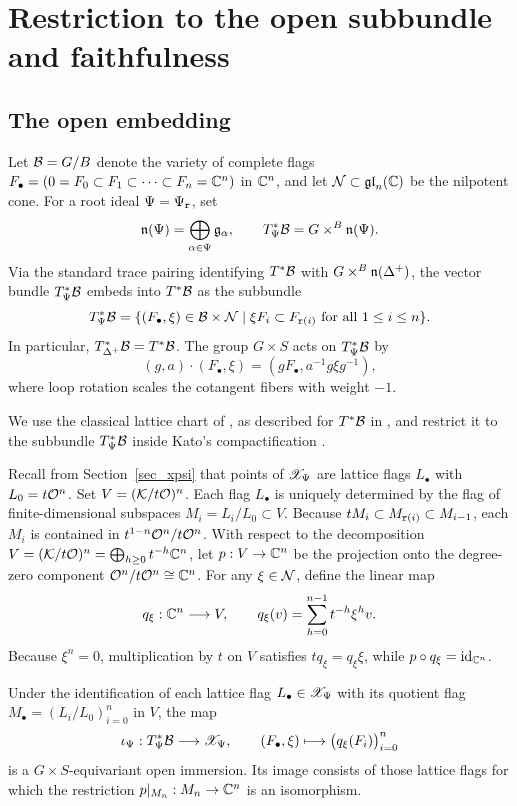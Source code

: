 \section{Restriction to the open subbundle and faithfulness}\label{sec_TX_incl}

\subsection{The open embedding}\label{ss:inclusion_TX_Xdelta_overview}

Let $\mathcal B=G/B$ denote the variety of complete flags
$F_\bullet=(0=F_0\subset F_1\subset\cdots\subset F_n=\mathbb C^n)$ in $\mathbb C^n$, and let
$\mathcal N\subset\mathfrak{gl}_n(\mathbb C)$ be the nilpotent cone.
For a root ideal $\Psi=\Psi_{\mathtt r}$, set
\[
  \mathfrak n(\Psi)=\bigoplus_{\alpha\in\Psi}\mathfrak g_\alpha,
  \qquad T^*_\Psi\mathcal B=G\times^B\mathfrak n(\Psi).
\]
Via the standard trace pairing identifying $T^*\mathcal B$ with $G\times^B\mathfrak n(\Delta^+)$,
the vector bundle $T^*_\Psi\mathcal B$ embeds into $T^*\mathcal B$ as the subbundle
\[
  T^*_\Psi\mathcal B
  =\{(F_\bullet,\xi)\in\mathcal B\times\mathcal N
        \mid \xi F_i\subset F_{\mathtt r(i)}\text{ for all }1\leq i\leq n\}.
\]
In particular, $T^*_{\Delta^+}\mathcal B=T^*\mathcal B$.
The group $G\times S$ acts on $T^*_\Psi\mathcal B$ by
\[
  (g,a)\cdot(F_\bullet,\xi)=(gF_\bullet,a^{-1}g\xi g^{-1}),
\]
where loop rotation scales the cotangent fibers with weight $-1$.

We use the classical lattice chart of
\cite{lusztig1981green,ngo1999faisceaux,mirkovic2003quiver}, as described for
$T^*\mathcal B$ in \cite[Lemma~11.2]{cautis2018quantum}, and restrict it to the
subbundle $T^*_\Psi\mathcal B$ inside Kato's compactification \cite{kato2023geometric}.

Recall from Section~\ref{sec_xpsi} that points of $\mathscr X_\Psi$ are lattice flags $L_\bullet$ with
$L_0=t\mathcal O^n$.
Set $V=(\mathcal K/t\mathcal O)^n$. Each flag $L_\bullet$ is uniquely determined by the flag of
finite-dimensional subspaces $M_i=L_i/L_0\subset V$.
Because $tM_i\subset M_{\mathtt r(i)}\subset M_{i-1}$, each $M_i$ is contained in $t^{1-n}\mathcal O^n/t\mathcal O^n$.
With respect to the decomposition $V=(\mathcal K/t\mathcal O)^n=\bigoplus_{h\geq 0}t^{-h}\mathbb C^n$, let $p:V\to\mathbb C^n$ be the projection onto the degree-zero component $\mathcal O^n/t\mathcal O^n\cong\mathbb C^n$.
For any $\xi\in\mathcal N$, define the linear map
\[
  q_\xi:\mathbb C^n\longrightarrow V,\qquad
  q_\xi(v)=\sum_{h=0}^{n-1}t^{-h}\xi^h v.
\]
Because $\xi^n=0$, multiplication by $t$ on $V$ satisfies $t q_\xi=q_\xi\xi$, while $p\circ q_\xi=\mathrm{id}_{\mathbb C^n}$.

\begin{proposition}\label{prop:T^*X_incl}
Under the identification of each lattice flag $L_\bullet\in\mathscr X_\Psi$
with its quotient flag $M_\bullet=(L_i/L_0)_{i=0}^n$ in $V$, the map
\[
  \iota_\Psi:T^*_\Psi\mathcal B\longrightarrow\mathscr X_\Psi,\qquad
  (F_\bullet,\xi)\longmapsto\bigl(q_\xi(F_i)\bigr)_{i=0}^n
\]
is a $G\times S$-equivariant open immersion.
Its image consists of those lattice flags for which the restriction
$p|_{M_n}:M_n\to\mathbb C^n$ is an isomorphism.
\end{proposition}

